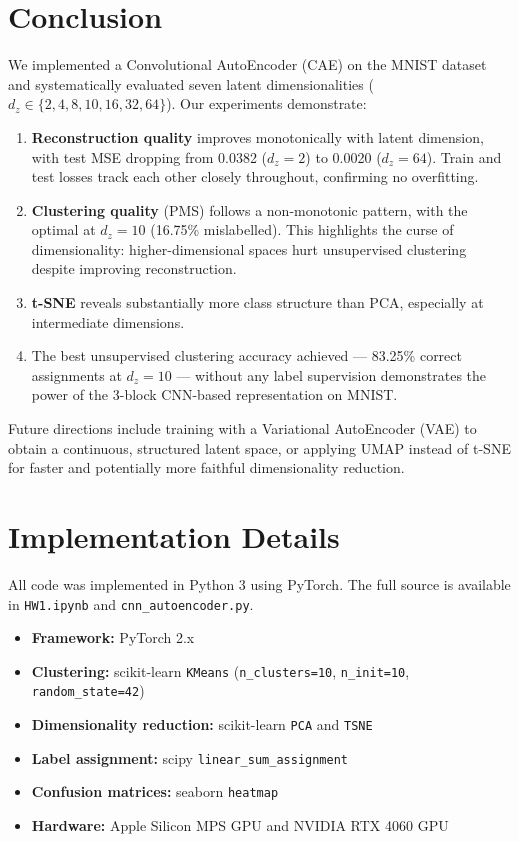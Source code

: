 \documentclass[12pt,a4paper]{article}
\begin{document}
\section{Conclusion}

We implemented a Convolutional AutoEncoder (CAE) on the MNIST dataset and systematically evaluated seven latent dimensionalities ($d_z \in \{2, 4, 8, 10, 16, 32, 64\}$). Our experiments demonstrate:

\begin{enumerate}
  \item \textbf{Reconstruction quality} improves monotonically with latent dimension, with test MSE dropping from 0.0382 ($d_z=2$) to 0.0020 ($d_z=64$). Train and test losses track each other closely throughout, confirming no overfitting.
  \item \textbf{Clustering quality} (PMS) follows a non-monotonic pattern, with the optimal at $d_z=10$ (16.75\% mislabelled). This highlights the curse of dimensionality: higher-dimensional spaces hurt unsupervised clustering despite improving reconstruction.
  \item \textbf{t-SNE} reveals substantially more class structure than PCA, especially at intermediate dimensions.
  \item The best unsupervised clustering accuracy achieved — 83.25\% correct assignments at $d_z=10$ — without any label supervision demonstrates the power of the 3-block CNN-based representation on MNIST.
\end{enumerate}

Future directions include training with a Variational AutoEncoder (VAE) to obtain a continuous, structured latent space, or applying UMAP instead of t-SNE for faster and potentially more faithful dimensionality reduction.

\appendix
\section{Implementation Details}

All code was implemented in Python 3 using PyTorch. The full source is available in \texttt{HW1.ipynb} and \texttt{cnn\_autoencoder.py}.

\begin{itemize}
  \item \textbf{Framework:} PyTorch 2.x
  \item \textbf{Clustering:} scikit-learn \texttt{KMeans} (\texttt{n\_clusters=10}, \texttt{n\_init=10}, \texttt{random\_state=42})
  \item \textbf{Dimensionality reduction:} scikit-learn \texttt{PCA} and \texttt{TSNE}
  \item \textbf{Label assignment:} scipy \texttt{linear\_sum\_assignment}
  \item \textbf{Confusion matrices:} seaborn \texttt{heatmap}
  \item \textbf{Hardware:} Apple Silicon MPS GPU and NVIDIA RTX 4060 GPU
\end{itemize}
\end{document}
